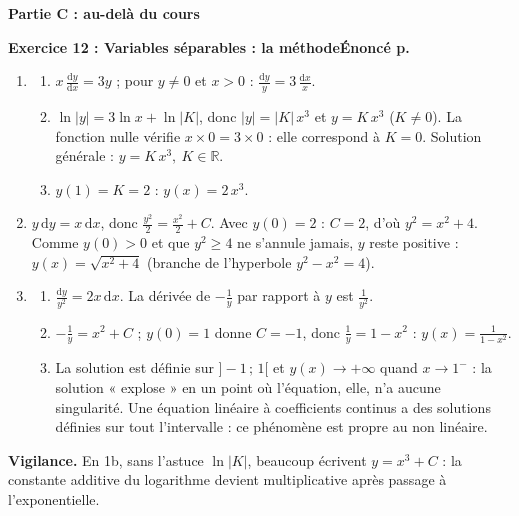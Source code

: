\documentclass[a4paper,11pt]{article}
\newcommand{\partie}[1]{\needspace{16\baselineskip}\vspace{6pt}%
\begin{tcolorbox}[colback=uimmblue, colframe=uimmblue, sharp corners, boxrule=0pt, left=10pt, top=4pt, bottom=4pt]
{\color{white}\large\bfseries #1}
\end{tcolorbox}}
\newcommand{\cor}[2]{\needspace{8\baselineskip}\vspace{8pt}%
\begin{tcolorbox}[colback=uimmlightblue, colframe=uimmblue, boxrule=0.8pt, arc=2pt, left=6pt, right=6pt, top=3pt, bottom=3pt]
{\color{uimmblue}\bfseries Exercice #1 : #2}\hfill{\small\color{uimmred}\bfseries Énoncé p.~\pageref*{E-exo:#1}}
\end{tcolorbox}}
\newcommand{\vig}[1]{\par{\small\color{uimmred}\textbf{Vigilance.} #1}\par}
\newcommand{\res}[1]{\colorbox{uimmlightblue}{$\displaystyle #1$}}
\newcommand{\dd}{\mathrm{d}}
\begin{document}
\partie{Partie C : au-delà du cours}

\cor{12}{Variables séparables : la méthode}
\begin{enumerate}
\item
\begin{enumerate}
\item $x\,\frac{\dd y}{\dd x} = 3y$ ; pour $y \neq 0$ et $x > 0$ : $\frac{\dd y}{y} = 3\,\frac{\dd x}{x}$.
\item $\ln|y| = 3\ln x + \ln|K|$, donc $|y| = |K|\,x^3$ et $y = K\,x^3$ ($K \neq 0$). La fonction nulle vérifie $x \times 0 = 3 \times 0$ : elle correspond à $K = 0$. Solution générale : \res{y = K\,x^3,\ K \in \mathbb{R}}.
\item $y(1) = K = 2$ : \res{y(x) = 2\,x^3}.
\end{enumerate}
\item $y\,\dd y = x\,\dd x$, donc $\frac{y^2}{2} = \frac{x^2}{2} + C$. Avec $y(0) = 2$ : $C = 2$, d'où $y^2 = x^2 + 4$. Comme $y(0) > 0$ et que $y^2 \geq 4$ ne s'annule jamais, $y$ reste positive : \res{y(x) = \sqrt{x^2 + 4}} (branche de l'hyperbole $y^2 - x^2 = 4$).
\item
\begin{enumerate}
\item $\frac{\dd y}{y^2} = 2x\,\dd x$. La dérivée de $-\frac1y$ par rapport à $y$ est $\frac{1}{y^2}$.
\item $-\frac1y = x^2 + C$ ; $y(0) = 1$ donne $C = -1$, donc $\frac1y = 1 - x^2$ : \res{y(x) = \frac{1}{1 - x^2}}.
\item La solution est définie sur $]-1\,;\,1[$ et $y(x) \to +\infty$ quand $x \to 1^-$ : la solution « explose » en un point où l'équation, elle, n'a aucune singularité. Une équation linéaire à coefficients continus a des solutions définies sur tout l'intervalle : ce phénomène est propre au non linéaire.
\end{enumerate}
\end{enumerate}
\vig{En 1b, sans l'astuce $\ln|K|$, beaucoup écrivent $y = x^3 + C$ : la constante additive du logarithme devient multiplicative après passage à l'exponentielle.}
\end{document}
